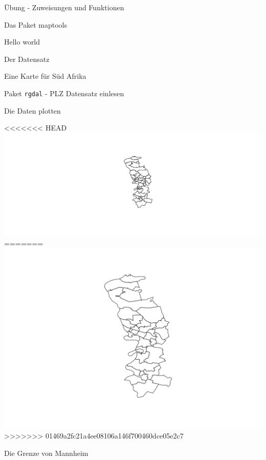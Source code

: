 \documentclass[ignorenonframetext,]{beamer}
\newenvironment{Shaded}{\begin{snugshade}}{\end{snugshade}}
\newcommand{\DecValTok}[1]{\textcolor[rgb]{0.27,0.67,0.26}{#1}}
\newcommand{\KeywordTok}[1]{\textcolor[rgb]{0.26,0.66,0.93}{\textbf{#1}}}
\newcommand{\NormalTok}[1]{\textcolor[rgb]{0.74,0.68,0.62}{#1}}
\newcommand{\OperatorTok}[1]{\textcolor[rgb]{0.74,0.68,0.62}{#1}}
\newcommand{\StringTok}[1]{\textcolor[rgb]{0.02,0.61,0.04}{#1}}
\begin{document}
\begin{frame}[fragile]{Übung - Zuweisungen und Funktionen}
\begin{frame}[fragile]{Das Paket maptools}
\begin{frame}[fragile]{Hello world}
\begin{frame}[fragile]{Der Datensatz}
\begin{frame}[fragile]{Eine Karte für Süd Afrika}
\begin{frame}[fragile]{Paket \texttt{rgdal} - PLZ Datensatz einlesen}
\end{frame}

\begin{frame}[fragile]{Die Daten plotten}
\protect\hypertarget{die-daten-plotten}{}

\begin{Shaded}
\end{Shaded}

<<<<<<< HEAD
\includegraphics{Geomedizin_files/figure-beamer/unnamed-chunk-117-1.pdf}
=======
\includegraphics{Geomedizin_files/figure-beamer/unnamed-chunk-138-1.pdf}
>>>>>>> 01469a2fc21a4ee08106a146f700460dce05e2c7

\end{frame}

\begin{frame}[fragile]{Die Grenze von Mannheim}
\protect\hypertarget{die-grenze-von-mannheim}{}


\end{frame}
\end{frame}
\end{frame}
\end{frame}
\end{frame}
\end{frame}
\end{document}
